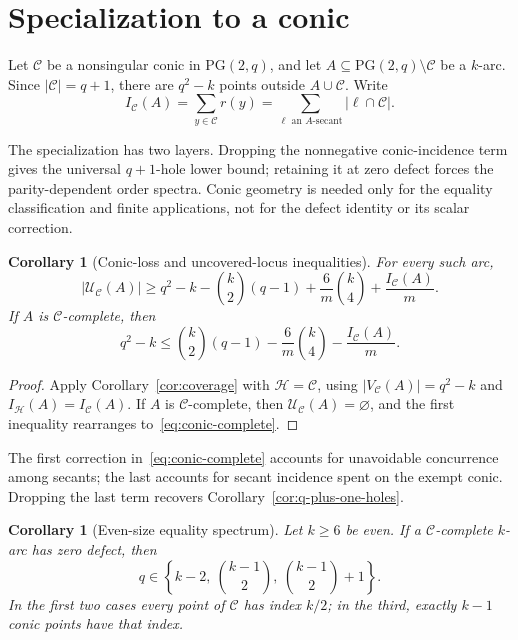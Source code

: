 \documentclass[11pt]{article}
\newtheorem{corollary}[theorem]{Corollary}
\theoremstyle{definition}
\theoremstyle{remark}
\newcommand{\PG}{\mathrm{PG}}
\newcommand{\cC}{\mathcal{C}}
\newcommand{\cH}{\mathcal{H}}
\newcommand{\cU}{\mathcal{U}}
\newcommand{\IC}{I_{\cC}}
\newcommand{\IH}{I_{\cH}}
\begin{document}
\section{Specialization to a conic}
\label{sec:conic}

Let $\cC$ be a nonsingular conic in $\PG(2,q)$, and let
$A\subseteq\PG(2,q)\setminus\cC$ be a $k$-arc.  Since $|\cC|=q+1$, there
are $q^2-k$ points outside $A\cup\cC$.  Write
\[
 \IC(A)=\sum_{y\in\cC}r(y)
       =\sum_{\ell\text{ an $A$-secant}}|\ell\cap\cC|.
\]

The specialization has two layers.  Dropping the nonnegative conic-incidence
term gives the universal \(q+1\)-hole lower bound; retaining it at zero defect
forces the parity-dependent order spectra.  Conic geometry is needed only for
the equality classification and finite applications, not for the defect
identity or its scalar correction.

\begin{corollary}[Conic-loss and uncovered-locus inequalities]
\label{cor:conic-bound}
For every such arc,
\begin{equation}
 |\cU_{\cC}(A)|\ge
 q^2-k-\binom{k}{2}(q-1)
 +\frac{6}{m}\binom{k}{4}+\frac{\IC(A)}m.
\label{eq:conic-uncovered}
\end{equation}
If $A$ is $\cC$-complete, then
\begin{equation}
\boxed{
 q^2-k\le
 \binom{k}{2}(q-1)-\frac{6}{m}\binom{k}{4}
 -\frac{\IC(A)}m.
}
\label{eq:conic-complete}
\end{equation}
\end{corollary}

\begin{proof}
Apply Corollary~\ref{cor:coverage} with $\cH=\cC$, using
$|V_{\cC}(A)|=q^2-k$ and $\IH(A)=\IC(A)$.  If $A$ is
$\cC$-complete, then $\cU_{\cC}(A)=\varnothing$, and the first inequality
rearranges to~\eqref{eq:conic-complete}.
\end{proof}

The first correction in~\eqref{eq:conic-complete} accounts for unavoidable
concurrence among secants; the last accounts for secant incidence spent on
the exempt conic.  Dropping the last term recovers
Corollary~\ref{cor:q-plus-one-holes}.

\begin{corollary}[Even-size equality spectrum]
\label{cor:even-equality-spectrum}
Let $k\ge6$ be even.  If a $\cC$-complete $k$-arc has zero defect, then
\[
 q\in
 \left\{
   k-2,\ \binom{k-1}{2},\ \binom{k-1}{2}+1
 \right\}.
\]
In the first two cases every point of $\cC$ has index $k/2$; in the third,
exactly $k-1$ conic points have that index.
\end{corollary}
\end{document}
